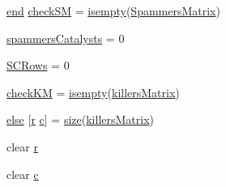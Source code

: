 \begin{DoxyCompactItemize}
\item 
\hyperlink{a00025_afb358f48b1646c750fb9da6c6585be2b}{end} \hyperlink{a00029_ae80cf4c5bf659247b45bbad5d22dec52}{check\-S\-M} = \hyperlink{a00025_ac10445404f4b83302522defb59e25ef7}{isempty}(\hyperlink{a00030_a5bca8ffaecd726e70d088f2e00c9b4e0}{Spammers\-Matrix})
\item 
\hyperlink{a00029_aac2cfcb79655911b15197407f3e8c51c}{spammers\-Catalysts} = 0
\item 
\hyperlink{a00029_a4c9731061d3ea74c9ad35793b15491ab}{S\-C\-Rows} = 0
\item 
\hyperlink{a00029_ac9c871eaf7455dc0d274ec20c5c69ac2}{check\-K\-M} = \hyperlink{a00025_ac10445404f4b83302522defb59e25ef7}{isempty}(\hyperlink{a00030_ab372fd9c8bb38cf3c78e995c0698b0ca}{killers\-Matrix})
\item 
\hyperlink{a00029_af5946383720aa572eb93e1e63afc23c2}{else} \mbox{[}\hyperlink{a00031_ac862e7284527eb913b1351c8bfb8e079}{r} \hyperlink{a00035_a6be92348ba85ef257b11d06209e1d7b6}{c}\mbox{]} = \hyperlink{a00104_ae113ea7f9e515a12ac4b5595c6faf61e}{size}(\hyperlink{a00030_ab372fd9c8bb38cf3c78e995c0698b0ca}{killers\-Matrix})
\item 
clear \hyperlink{a00029_ac862e7284527eb913b1351c8bfb8e079}{r}
\item 
clear \hyperlink{a00029_a8e54ca14679a1ce9245a3b7d55d95570}{c}
\end{DoxyCompactItemize}


